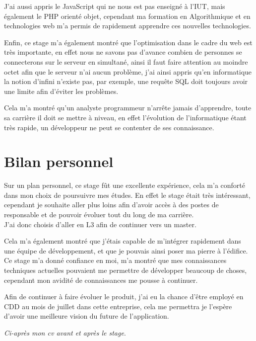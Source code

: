 J'ai aussi appris le JavaScript qui ne nous est pas enseigné à l'IUT, mais également le PHP orienté objet, cependant ma formation en Algorithmique et en technologies web m'a permis de rapidement apprendre ces nouvelles technologies.

Enfin, ce stage m'a également montré que l'optimisation dans le cadre du web est très importante, en effet nous ne savons pas d'avance combien de personnes se connecterons sur le serveur en simultané, ainsi il faut faire attention au moindre octet afin que le serveur n'ai aucun problème, j'ai ainsi appris qu'en informatique la notion d'infini n'existe pas, par exemple, une requête SQL doit toujours avoir une limite afin d'éviter les problèmes.

Cela m'a montré qu'un analyste programmeur n'arrête jamais d'apprendre, toute sa carrière il doit se mettre à niveau, en effet l'évolution de l'informatique étant très rapide, un développeur ne peut se contenter de ses connaissance.

\section{Bilan personnel}
    Sur un plan personnel, ce stage fût une excellente expérience, cela m'a conforté dans mon choix de poursuivre mes études. En effet le stage était très intéressant, cependant je souhaite aller plus loins afin d'avoir accès à des postes de responsable et de pouvoir évoluer tout du long de ma carrière.\\
    J'ai donc choisis d'aller en L3 afin de continuer vers un master.

    Cela m'a également montré que j'étais capable de m'intégrer rapidement dans une équipe de développement, et que je pouvais ainsi poser ma pierre à l'édifice. Ce stage m'a donné confiance en moi, m'a montré que mes connaissances techniques actuelles pouvaient me permettre de développer beaucoup de choses, cependant mon avidité de connaissances me pousse à continuer.

    Afin de continuer à faire évoluer le produit, j'ai eu la chance d'être employé en CDD au mois de juillet dans cette entreprise, cela me permettra je l'espère d'avoir une meilleure vision du future de l'application.

\vfill
\textit{Ci-après mon cv avant et après le stage}.




